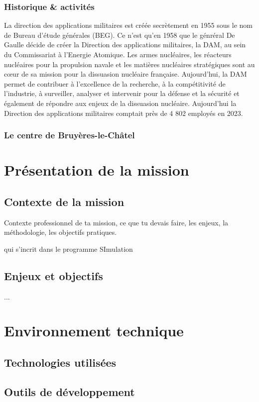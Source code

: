 \documentclass[12pt,a4paper]{report}
\begin{document}
\subsection{Historique \& activités}
La direction des applications militaires est créée secrètement en 1955 sous le nom de Bureau d'étude générales (BEG). Ce n'est qu'en 1958 que le génréral De Gaulle décide de créer la Direction des applications militaires, la DAM, au sein du Commissariat à l’Energie Atomique. Les armes nucléaires, les réacteurs nucléaires pour la propulsion navale et les matières nucléaires stratégiques sont au cœur de sa mission pour la dissuasion nucléaire française. Aujourd'hui, la DAM permet de contribuer à l'excellence de la recherche, à la compétitivité de l'industrie, à surveiller, analyser et intervenir pour la défense et la sécurité et également de répondre aux enjeux de la dissuasion nucléaire. Aujourd'hui la Direction des applications militaires comptait près de 4 802 employés en 2023.
\subsection{Le centre de Bruyères-le-Châtel}



\chapter{Présentation de la mission}
\section{Contexte de la mission}
Contexte professionnel de ta mission, ce que tu devais faire, les enjeux, la méthodologie, les objectifs pratiques.

qui s'incrit dans le programme SImulation
\section{Enjeux et objectifs}
... %

\chapter{Environnement technique}
\section{Technologies utilisées}
\section{Outils de développement}
\end{document}
